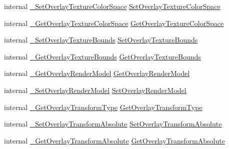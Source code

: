 \begin{DoxyCompactItemize}
\item 
internal \mbox{\hyperlink{struct_valve_1_1_v_r_1_1_i_v_r_overlay_adedd3e23f701f36634b7d6a228ec03e2}{\+\_\+\+Set\+Overlay\+Texture\+Color\+Space}} \mbox{\hyperlink{struct_valve_1_1_v_r_1_1_i_v_r_overlay_a02e6c24983b395fedcf5997d628e0632}{Set\+Overlay\+Texture\+Color\+Space}}
\item 
internal \mbox{\hyperlink{struct_valve_1_1_v_r_1_1_i_v_r_overlay_a1622c8b6098d1b37a9a8f2a1b961f1cf}{\+\_\+\+Get\+Overlay\+Texture\+Color\+Space}} \mbox{\hyperlink{struct_valve_1_1_v_r_1_1_i_v_r_overlay_a5c10d74dfee0c52a2ef094fcef46e77f}{Get\+Overlay\+Texture\+Color\+Space}}
\item 
internal \mbox{\hyperlink{struct_valve_1_1_v_r_1_1_i_v_r_overlay_a08630b9ab7638afe9502371ca7440300}{\+\_\+\+Set\+Overlay\+Texture\+Bounds}} \mbox{\hyperlink{struct_valve_1_1_v_r_1_1_i_v_r_overlay_a69b9a9c7772ad5ee43c3fc06176ca5c7}{Set\+Overlay\+Texture\+Bounds}}
\item 
internal \mbox{\hyperlink{struct_valve_1_1_v_r_1_1_i_v_r_overlay_afae80e32021ddd3855f12f12aa5a0022}{\+\_\+\+Get\+Overlay\+Texture\+Bounds}} \mbox{\hyperlink{struct_valve_1_1_v_r_1_1_i_v_r_overlay_a59ccd461a9056561895307685cacc479}{Get\+Overlay\+Texture\+Bounds}}
\item 
internal \mbox{\hyperlink{struct_valve_1_1_v_r_1_1_i_v_r_overlay_a97891b66fe3f14691f4eb8f6642ad5ef}{\+\_\+\+Get\+Overlay\+Render\+Model}} \mbox{\hyperlink{struct_valve_1_1_v_r_1_1_i_v_r_overlay_aa445b10a62d173396e90fa11d8e726d3}{Get\+Overlay\+Render\+Model}}
\item 
internal \mbox{\hyperlink{struct_valve_1_1_v_r_1_1_i_v_r_overlay_a1bbe01ba8283e551d3d818e31199e39b}{\+\_\+\+Set\+Overlay\+Render\+Model}} \mbox{\hyperlink{struct_valve_1_1_v_r_1_1_i_v_r_overlay_a5bec8ad5f2b4ea1efb6feeb8083623f1}{Set\+Overlay\+Render\+Model}}
\item 
internal \mbox{\hyperlink{struct_valve_1_1_v_r_1_1_i_v_r_overlay_a99fe5b9dbb9381067659cb1c5e5a1cd9}{\+\_\+\+Get\+Overlay\+Transform\+Type}} \mbox{\hyperlink{struct_valve_1_1_v_r_1_1_i_v_r_overlay_a311246a2943dd78801744e97cc91b572}{Get\+Overlay\+Transform\+Type}}
\item 
internal \mbox{\hyperlink{struct_valve_1_1_v_r_1_1_i_v_r_overlay_a3c03a5b1bb15a5be4bc66a4cfeea8ebb}{\+\_\+\+Set\+Overlay\+Transform\+Absolute}} \mbox{\hyperlink{struct_valve_1_1_v_r_1_1_i_v_r_overlay_a0441939e81153de42173bd34641d1613}{Set\+Overlay\+Transform\+Absolute}}
\item 
internal \mbox{\hyperlink{struct_valve_1_1_v_r_1_1_i_v_r_overlay_a1a1ee40ba7c9c9826b3646ded3df209f}{\+\_\+\+Get\+Overlay\+Transform\+Absolute}} \mbox{\hyperlink{struct_valve_1_1_v_r_1_1_i_v_r_overlay_a6bd8970d11bfbfd905fc4a87f2bb458a}{Get\+Overlay\+Transform\+Absolute}}

\end{DoxyCompactItemize}
